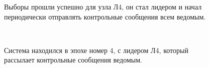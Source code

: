 \documentclass[subf, href, colorlinks=true, 14pt,
times, mtpro, specialist]{disser}
\theoremstyle{definition}
\begin{document}
\begin{figure}[H]
\begin{minipage}[h]{0.46\linewidth}
\begin{small}
Выборы прошли успешно для узла Л4, он стал лидером и начал периодически отправлять контрольные сообщения всем ведомым.
\end{small}
\end{minipage}
\caption{}
\label{fig:init}
\end{figure}

\
\newpage
\begin{figure}[H]
\vspace{-1cm}
\begin{minipage}[h]{0.46\linewidth}
\begin{small}
Система находился в эпохе номер 4, с лидером Л4, который рассылает контрольные сообщения ведомым. \\
\end{small}
\end{minipage}
\hfill
\begin{minipage}[h]{0.46\linewidth}
\vspace{0.6cm}

\end{minipage}
\end{figure}
\end{document}

